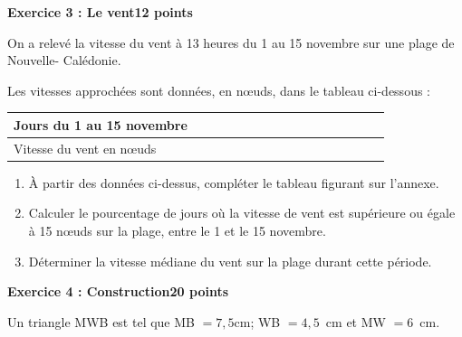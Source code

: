 \documentclass[11pt]{article}
\begin{document}
\bigskip

\textbf{Exercice 3 : Le vent\hfill 12 points}

\medskip

On a relevé la vitesse du vent à 13 heures du 1 au 15 novembre sur une plage de Nouvelle- Calédonie. 

Les vitesses approchées sont données, en nœuds, dans le tableau ci-dessous :

\begin{center}
\begin{tabularx}{\linewidth}{|m{3cm}|*{15}{>{\centering \arraybackslash}X|}}\hline
Jours du 1\up{er} au 15 novembre&1 &2 &3 &4 &5 &6 &7 &8 &9 &10 &11 &12 &13 &14 &15\\ \hline
Vitesse du vent en nœuds& 10 &15 &20 &20 &15 &10 &10 &20 &15 &25 &25 &25 &20 &15 &15\\ \hline
\end{tabularx}
\end{center}

\begin{enumerate}
\item À partir des données ci-dessus, compléter le tableau figurant sur l'annexe.
\item Calculer le pourcentage de jours où la vitesse de vent est supérieure ou égale à 15 nœuds sur la plage, entre le 1 et le 15 novembre.
\item Déterminer la vitesse médiane du vent sur la plage durant cette période.
\end{enumerate}

\bigskip

\textbf{Exercice 4 : Construction\hfill 20 points}

\medskip

Un triangle MWB est tel que MB $= 7,5$cm; WB $= 4,5$~cm et MW $= 6$~cm.

\medskip
\end{document}
